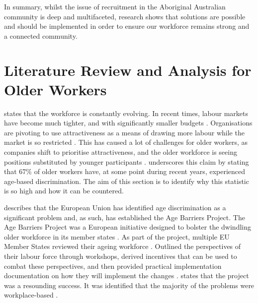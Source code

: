 \documentclass{article}
\begin{document}
In summary, whilst the issue of recruitment in the Aboriginal Australian community is deep and multifaceted, research shows that solutions are possible and should be implemented in order to ensure our workforce remains strong and a connected community. 

\clearpage
\section{Literature Review and Analysis for Older Workers}
\textcite{lievensRecruitingHiringOlder2012} states that the workforce is constantly evolving. In recent times, labour markets have become much tighter, and with significantly smaller budgets \parencite{lievensRecruitingHiringOlder2012}. Organisations are pivoting to use attractiveness as a means of drawing more labour while the market is so restricted \parencite{lievensRecruitingHiringOlder2012}. This has caused a lot of challenges for older workers, as companies shift to prioritise attractiveness, and the older workforce is seeing positions substituted by younger participants \parencite{drydakisInclusiveRecruitmentHiring2017}. \cite{drydakisInclusiveRecruitmentHiring2017} underscores this claim by stating that 67\% of older workers have, at some point during recent years, experienced age-based discrimination. The aim of this section is to identify why this statistic is so high and how it can be countered.

\textcite{walkerCombatingAgeDiscrimination1999} describes that the European Union has identified age discrimination as a significant problem and, as such, has established the Age Barriers Project. The Age Barriers Project was a European initiative designed to bolster the dwindling older workforce in its member states \parencite{walkerCombatingAgeBarriers1998}. As part of the project, multiple EU Member States reviewed their ageing workforce \parencite{walkerCombatingAgeBarriers1998}. Outlined the perspectives of their labour force through workshops, derived incentives that can be used to combat these perspectives, and then provided practical implementation documentation on how they will implement the changes \parencite{walkerCombatingAgeBarriers1998}. \cite{walkerCombatingAgeDiscrimination1999} states that the project was a resounding success. It was identified that the majority of the problems were workplace-based \parencite{walkerCombatingAgeDiscrimination1999}.
\end{document}
